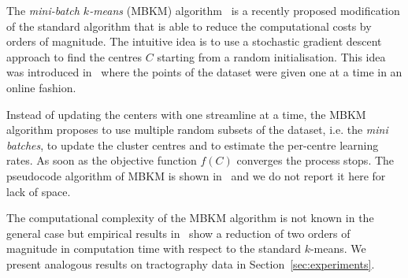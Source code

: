 The \emph{mini-batch $k$-means} (MBKM) algorithm~\cite{sculley2010web}
is a recently proposed modification of the standard algorithm that is
able to reduce the computational costs by orders of magnitude. The
intuitive idea is to use a stochastic gradient descent approach to
find the centres $C$ starting from a random initialisation. This idea
was introduced in~\cite{bottou1995convergence} where the points of the
dataset were given one at a time in an online fashion.

Instead of updating the centers with one streamline at a time, the
MBKM algorithm proposes to use multiple random subsets of the dataset,
i.e. the \emph{mini batches}, to update the cluster centres and to
estimate the per-centre learning rates. As soon as the objective
function $f(C)$ converges the process
stops. The pseudocode algorithm of MBKM is shown
in~\cite{sculley2010web} and we do not report it here for lack of
space.

The computational complexity of the MBKM algorithm is not known in the
general case but empirical results in~\cite{sculley2010web} show a
reduction of two orders of magnitude in computation time with respect
to the standard $k$-means. We present analogous results on
tractography data in Section~\ref{sec:experiments}.





